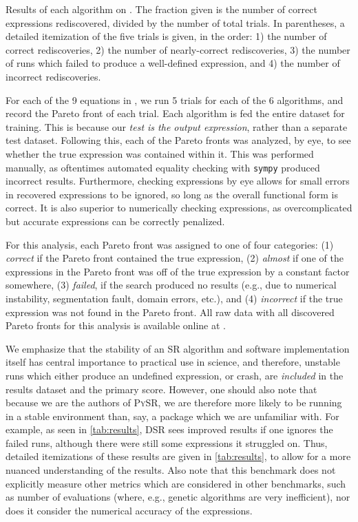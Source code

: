 \documentclass[letterpaper,twocolumn]{scrartcl}
\newcommand\we{we\xspace}
\newcommand\We{We\xspace}
\newcommand\pysr{\textsc{PySR}\xspace}
\newcommand\sr{SR\xspace}
\begin{document}
\begin{table*}[h!]
    \centering
    \caption{Results of each algorithm on \bench.
    The fraction given is the number of correct expressions rediscovered, divided by the number of total trials.
    In parentheses, a detailed itemization of the five trials is given, in the order: 1) the number of correct rediscoveries, 2) the number of nearly-correct rediscoveries, 3) the number of runs which failed to produce a well-defined expression, and 4) the number of incorrect rediscoveries.
    }
    \label{tab:results}
\end{table*}

For each of the 9 equations in \bench, we run 5 trials for each of the 6 algorithms, and record the Pareto front of each trial.
Each algorithm is fed the entire dataset for training.
This is because our \textit{test is the output expression}, rather than a separate test dataset.
Following this, each of the Pareto fronts was analyzed, by eye, to see whether the true expression was contained within it.
This was performed manually, as oftentimes automated equality checking with \texttt{sympy} produced incorrect results.
Furthermore, checking expressions by eye allows for small errors in recovered expressions to be ignored, so long as the overall functional form is correct.
It is also superior to numerically checking expressions, as overcomplicated but accurate expressions can be correctly penalized.

For this analysis, each Pareto front was assigned to one of four categories: (1) \textit{correct} if the Pareto front contained the true expression, (2) \textit{almost} if one of the expressions in the Pareto front was off of the true expression by a constant factor somewhere, (3) \textit{failed}, if the search produced no results (e.g., due to numerical instability, segmentation fault, domain errors, etc.), and (4) \textit{incorrect} if the true expression was not found in the Pareto front.
All raw data with all discovered Pareto fronts for this analysis is available online at .



\We emphasize that the stability of an \sr algorithm and software implementation itself has central importance to practical use in science, and therefore, unstable runs which either produce an undefined expression, or crash, are \textit{included} in the results dataset and the primary score.
However, one should also note that because \we are the authors of \pysr, we are therefore more likely to be running in a stable environment than, say, a package which \we are unfamiliar with.
For example, as seen in \cref{tab:results}, DSR sees improved results if one ignores the failed runs, although there were still some expressions it struggled on.
Thus, detailed itemizations of these results are given in \cref{tab:results}, to allow for a more nuanced understanding of the results.
Also note that this benchmark does not explicitly measure other metrics which are considered in other benchmarks, such as number of evaluations (where, e.g., genetic algorithms are very inefficient), nor does it consider the numerical accuracy of the expressions.
\end{document}
